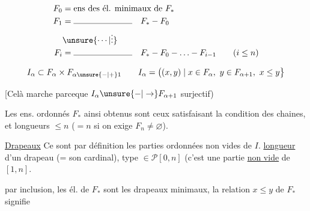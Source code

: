 \[
\begin{aligned}
 F_0&=\text{ens des él. minimaux de }F_*\\
 F_1&=\rule{7em}{.35pt}\quad F_*-F_0\\
 &\unsure{\cdots|\vdots}\\
 F_i&=\rule{7em}{.35pt}\quad F_*-F_0-\ldots-F_{i-1}\qquad(i\leq n)
\end{aligned}
\]


\[
 I_\alpha\subset F_\alpha\times F_{\alpha\unsure{-|+}1}\qquad
 I_\alpha=\bigl((x,y)\mid x\in F_\alpha,\ y\in F_{\alpha+1},\ x\leq y\bigr\}
\]

[Celà marche parceque $I_\alpha\unsure{-|\to} F_{\alpha+1}$ surjectif)

Les ens. ordonnés $F_*$ ainsi obtenus sont  ceux satisfaisant la condition des chaines, et    longueurs  $\leq n$ ($=n$ si on exige $F_n\neq\varnothing$).


 \uline{Drapeaux} Ce sont par définition les parties  ordonnées non vides de $I$. \uline{longueur} d'un drapeau (= son cardinal), type $\in\mathscr P[0,n]$ (c'est une partie \uline{non vide} de $[1,n]$.


par inclusion, les él. de $F_*$ sont les drapeaux minimaux, la relation $x\leq y$ de $F_*$ signifie 

